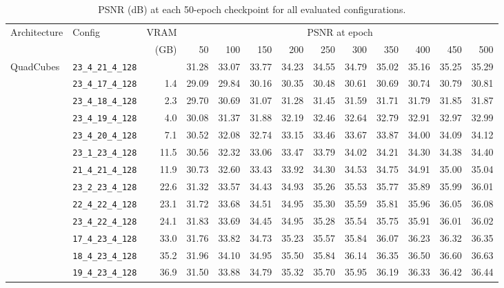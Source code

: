 \documentclass[12pt, a4paper, twoside]{report}
\begin{document}
\begin{table}[htbp]
\caption{PSNR (dB) at each 50-epoch checkpoint for all evaluated configurations.}
\label{tab:app_epoch}
\begin{adjustwidth}{-3cm}{-1cm}
\centering
\footnotesize
\setlength{\tabcolsep}{3.5pt}
\begin{tabular}{llrrrrrrrrrrr}
\toprule
Architecture & Config & VRAM & \multicolumn{10}{c}{PSNR at epoch} \\
\cmidrule(lr){4-13}
 & & (GB) & 50 & 100 & 150 & 200 & 250 & 300 & 350 & 400 & 450 & 500 \\
\midrule
  QuadCubes & \texttt{23\_4\_21\_4\_128} &   & 31.28 & 33.07 & 33.77 & 34.23 & 34.55 & 34.79 & 35.02 & 35.16 & 35.25 & 35.29 \\
   & \texttt{23\_4\_17\_4\_128} & 1.4 & 29.09 & 29.84 & 30.16 & 30.35 & 30.48 & 30.61 & 30.69 & 30.74 & 30.79 & 30.81 \\
   & \texttt{23\_4\_18\_4\_128} & 2.3 & 29.70 & 30.69 & 31.07 & 31.28 & 31.45 & 31.59 & 31.71 & 31.79 & 31.85 & 31.87 \\
   & \texttt{23\_4\_19\_4\_128} & 4.0 & 30.08 & 31.37 & 31.88 & 32.19 & 32.46 & 32.64 & 32.79 & 32.91 & 32.97 & 32.99 \\
   & \texttt{23\_4\_20\_4\_128} & 7.1 & 30.52 & 32.08 & 32.74 & 33.15 & 33.46 & 33.67 & 33.87 & 34.00 & 34.09 & 34.12 \\
   & \texttt{23\_1\_23\_4\_128} & 11.5 & 30.56 & 32.32 & 33.06 & 33.47 & 33.79 & 34.02 & 34.21 & 34.30 & 34.38 & 34.40 \\
   & \texttt{21\_4\_21\_4\_128} & 11.9 & 30.73 & 32.60 & 33.43 & 33.92 & 34.30 & 34.53 & 34.75 & 34.91 & 35.00 & 35.04 \\
   & \texttt{23\_2\_23\_4\_128} & 22.6 & 31.32 & 33.57 & 34.43 & 34.93 & 35.26 & 35.53 & 35.77 & 35.89 & 35.99 & 36.01 \\
   & \texttt{22\_4\_22\_4\_128} & 23.1 & 31.72 & 33.68 & 34.51 & 34.95 & 35.30 & 35.59 & 35.81 & 35.96 & 36.05 & 36.08 \\
   & \texttt{23\_4\_22\_4\_128} & 24.1 & 31.83 & 33.69 & 34.45 & 34.95 & 35.28 & 35.54 & 35.75 & 35.91 & 36.01 & 36.02 \\
   & \texttt{17\_4\_23\_4\_128} & 33.0 & 31.76 & 33.82 & 34.73 & 35.23 & 35.57 & 35.84 & 36.07 & 36.23 & 36.32 & 36.35 \\
   & \texttt{18\_4\_23\_4\_128} & 35.2 & 31.96 & 34.10 & 34.95 & 35.50 & 35.84 & 36.14 & 36.35 & 36.50 & 36.60 & 36.63 \\
   & \texttt{19\_4\_23\_4\_128} & 36.9 & 31.50 & 33.88 & 34.79 & 35.32 & 35.70 & 35.95 & 36.19 & 36.33 & 36.42 & 36.44 \\

\end{tabular}
\end{adjustwidth}
\end{table}
\end{document}
